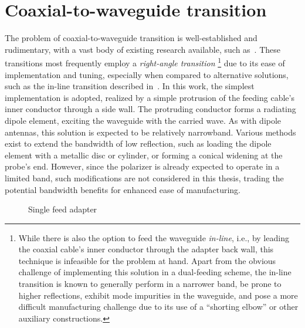 \documentclass[11pt,a4paper,twoside,openany]{report}
\newlength{\twosubht}
\begin{document}
\section{Coaxial-to-waveguide transition}
\label{section:coaxial-to-waveguide-transition}
The problem of coaxial-to-waveguide transition is well-established and rudimentary, with a vast body of existing research available, such as~\parencite{fabregas-et-al:coaxial-to-rectangular-waveguide-transitions}. These transitions most frequently employ a \emph{right-angle transition}%
    \footnote{While there is also the option to feed the waveguide \emph{in-line}, i.e., by leading the coaxial cable's inner conductor through the adapter back wall, this technique is infeasible for the problem at hand. Apart from the obvious challenge of implementing this solution in a dual-feeding scheme, the in-line transition is known to generally perform in a narrower band, be prone to higher reflections, exhibit mode impurities in the waveguide, and pose a more difficult manufacturing challenge due to its use of a \enquote{shorting elbow} or other auxiliary constructions.}
due to its ease of implementation and tuning, especially when compared to alternative solutions, such as the in-line transition described in~\parencite{durga-et-al:millimiter-wave-inline-coaxial-to-rectangular-waveguide-transition}. In this work, the simplest implementation is adopted, realized by a simple protrusion of the feeding cable's inner conductor through a side wall. The protruding conductor forms a radiating dipole element, exciting the waveguide with the carried wave. As with dipole antennas, this solution is expected to be relatively narrowband. Various methods exist to extend the bandwidth of low reflection, such as loading the dipole element with a metallic disc or cylinder, or forming a conical widening at the probe's end. However, since the polarizer is already expected to operate in a limited band, such modifications are not considered in this thesis, trading the potential bandwidth benefits for enhanced ease of manufacturing.

\begin{figure}[!ht]
    \sbox{}
    \setlength{\twosubht}{\ht\twosubbox}

    \centering
    \quad
    \caption{\label{fig:single-feed-model}Single feed adapter}
\end{figure}
\end{document}
